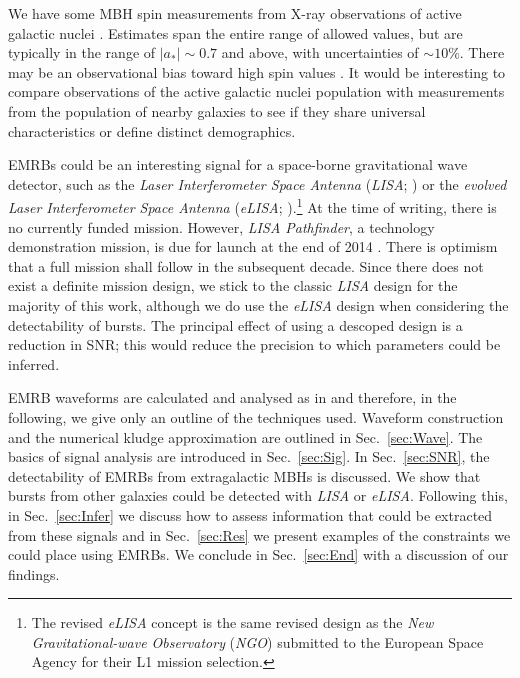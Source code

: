 \documentclass[useAMS,usedcolumn,usegraphicx,usenatbib]{mn2e}
\newcommand{\secref}[1]{Sec.~\ref{sec:#1}}
\begin{document}
We have some MBH spin measurements from X-ray observations of active galactic nuclei \citep[e.g.,][]{Walton2013}. Estimates span the entire range of allowed values, but are typically in the range of $|a_\ast| \sim 0.7$ and above, with uncertainties of $\sim 10\%$. There may be an observational bias toward high spin values \citep{Brenneman2011}. It would be interesting to compare observations of the active galactic nuclei population with measurements from the population of nearby galaxies to see if they share universal characteristics or define distinct demographics. %

EMRBs could be an interesting signal for a space-borne gravitational wave detector, such as the \textit{Laser Interferometer Space Antenna} (\textit{LISA}; \citealt{Bender1998, Danzmann2003}) or the \textit{evolved Laser Interferometer Space Antenna} (\textit{eLISA}; \citealt{Jennrich2011, Amaro-Seoane2012a}).\footnote{The revised \textit{eLISA} concept is the same revised design as the \textit{New Gravitational-wave Observatory} (\textit{NGO}) submitted to the European Space Agency for their L1 mission selection.} At the time of writing, there is no currently funded mission. However, \textit{LISA Pathfinder}, a technology demonstration mission, is due for launch at the end of 2014 \citep{Anza2005, Antonucci2012}. There is optimism that a full mission shall follow in the subsequent decade. Since there does not exist a definite mission design, we stick to the classic \textit{LISA} design for the majority of this work, although we do use the \textit{eLISA} design when considering the detectability of bursts. The principal effect of using a descoped design is a reduction in SNR; this would reduce the precision to which parameters could be inferred.

EMRB waveforms are calculated and analysed as in \citet{Berry2013} and therefore, in the following, we give only an outline of the techniques used. Waveform construction and the numerical kludge approximation are outlined in \secref{Wave}. The basics of signal analysis are introduced in \secref{Sig}. In \secref{SNR}, the detectability of EMRBs from extragalactic MBHs is discussed. We show that bursts from other galaxies could be detected with \textit{LISA} or \textit{eLISA}. Following this, in \secref{Infer} we discuss how to assess information that could be extracted from these signals and in \secref{Res} we present examples of the constraints we could place using EMRBs. We conclude in \secref{End} with a discussion of our findings.
\end{document}
